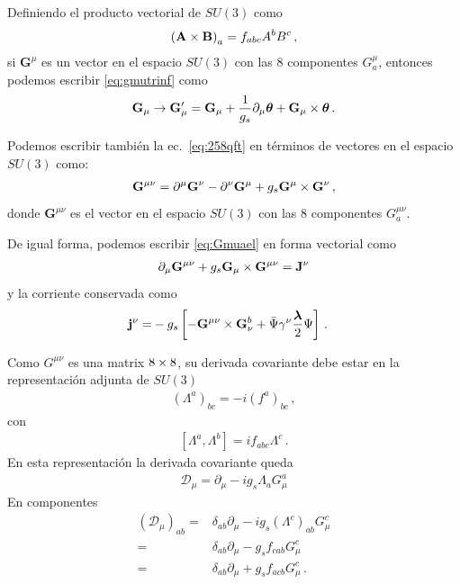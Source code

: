 Definiendo el producto vectorial de $SU(3)$ como
\begin{align}
  \left(\mathbf{A}\times \mathbf{B}\right)_a=f_{abc}A^b B^c\,,
\end{align}
si $\mathbf{G}^\mu$ es un vector en el espacio $SU(3)$ con las 8 componentes $G^\mu_a$, entonces podemos escribir \eqref{eq:gmutrinf} como
\begin{align}
  \mathbf{G}_\mu\to\mathbf{G}'_\mu=\mathbf{G}_\mu+\frac{1}{g_s}\partial_\mu\boldsymbol{\theta}+\mathbf{G}_\mu\times \boldsymbol{\theta}\,.
\end{align}

Podemos escribir también la ec.~\eqref{eq:258qft} en términos de vectores en el espacio $SU(3)$ como:
\begin{align}
  \mathbf{G}^{\mu\nu}=\partial^\mu \mathbf{G}^\nu-\partial^\nu \mathbf{G}^\mu+g_s \mathbf{G}^\mu\times  \mathbf{G}^\nu\,,
\end{align}
donde $\mathbf{G}^{\mu\nu}$ es el vector en el espacio $SU(3)$ con las 8 componentes $G^{\mu\nu}_a$.



De igual forma, podemos escribir \eqref{eq:Gmuael} en forma vectorial como
\begin{align}
  \partial_\mu\mathbf{G}^{\mu\nu}+g_s \mathbf{G}_\mu\times \mathbf{G}^{\mu\nu}=\mathbf{J}^\nu
\end{align}
y la corriente conservada como
\begin{align}
 \mathbf{j}^\nu =&-g_s\left[-\mathbf{G}^{\mu\nu}\times \mathbf{G}_\nu^b+\bar{\Psi}\gamma^\nu\frac{\boldsymbol{\lambda}}{2}\Psi  \right]\,.
\end{align}

Como ${G}^{\mu\nu}$ es una matrix $8\times 8$, su derivada covariante debe estar en la representación adjunta de $SU(3)$
\begin{align}
  \left(\Lambda^a\right)_{bc}=-i\left(f^a\right)_{bc}\,,
\end{align}
con
\begin{align}
  \left[\Lambda^a,\Lambda^b\right]=i f_{abc}\Lambda^c\,.
\end{align}
En esta representación la derivada covariante queda
\begin{align}
  \mathcal{D}_\mu=\partial_\mu-i g_s\Lambda_aG_\mu^a
\end{align}
En componentes
\begin{align}
  \left(\mathcal{D}_\mu\right)_{ab}=&\delta_{ab}\partial_\mu-i g_s (\Lambda^c)_{ab}G_\mu^c\nonumber\\
  =&\delta_{ab}\partial_\mu-g_s f_{cab}G_\mu^c\nonumber\\
  =&\delta_{ab}\partial_\mu+g_s f_{acb}G_\mu^c\,.
\end{align}


